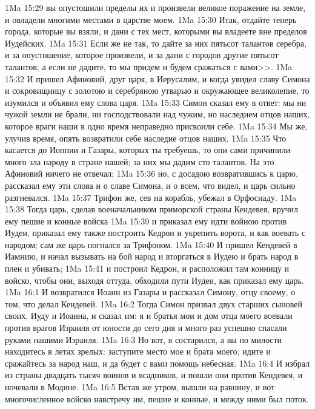 \vs 1Ma 15:29 вы опустошили пределы их и произвели великое поражение на земле, и овладели многими местами в царстве моем.
\vs 1Ma 15:30 Итак, отдайте теперь города, которые вы взяли, и дани с тех мест, которыми вы владеете вне пределов Иудейских.
\vs 1Ma 15:31 Если же не так, то дайте за них пятьсот талантов серебра, и за опустошение, которое произвели, и за дани с городов другие пятьсот талантов; а если не дадите, то мы придем и будем сражаться с вами>>.
\vs 1Ma 15:32 И пришел Афиновий, друг царя, в Иерусалим, и когда увидел славу Симона и сокровищницу с золотою и серебряною утварью и окружающее великолепие, то изумился и объявил ему слова царя.
\vs 1Ma 15:33 Симон сказал ему в ответ: мы ни чужой земли не брали, ни господствовали над чужим, но  наследием отцов наших, которое враги наши в одно время неправедно присвоили себе.
\vs 1Ma 15:34 Мы же, улучив время, опять возвратили себе наследие отцов наших.
\vs 1Ma 15:35 Что касается до Иоппии и Газары, которых ты требуешь, то они сами причинили много зла народу в стране нашей; за них мы дадим сто талантов. На это Афиновий ничего не отвечал;
\vs 1Ma 15:36 но, с досадою возвратившись к царю, рассказал ему эти слова и о славе Симона, и о всем, что видел, и царь сильно разгневался.
\vs 1Ma 15:37 Трифон же, сев на корабль, убежал в Орфосиаду.
\vs 1Ma 15:38 Тогда царь, сделав военачальником приморской страны Кендевея, вручил ему пешие и конные войска
\vs 1Ma 15:39 и приказал ему идти войною против Иудеи, приказал ему также построить Кедрон и укрепить ворота, и как воевать с народом; сам же царь погнался за Трифоном.
\vs 1Ma 15:40 И пришел Кендевей в Иамнию, и начал вызывать на бой народ и вторгаться в Иудею и брать народ в плен и убивать;
\vs 1Ma 15:41 и построил Кедрон, и расположил там конницу и войско, чтобы они, выходя оттуда, обходили пути Иудеи, как приказал ему царь.
\vs 1Ma 16:1 И возвратился Иоанн из Газары и рассказал Симону, отцу своему, о том, что делал Кендевей.
\vs 1Ma 16:2 Тогда Симон призвал двух старших сыновей своих, Иуду и Иоанна, и сказал им: я и братья мои и дом отца моего воевали против врагов Израиля от юности до сего дня и много раз успешно спасали руками нашими Израиля.
\vs 1Ma 16:3 Но вот, я состарился, а вы по милости  находитесь в летах зрелых: заступите место мое и брата моего, идите и сражайтесь за народ наш, и да будет с вами помощь небесная.
\vs 1Ma 16:4 И избрал из страны двадцать тысяч воинов и всадников, и пошли они против Кендевея, и ночевали в Модине.
\vs 1Ma 16:5 Встав же утром, вышли на равнину, и вот многочисленное войско навстречу им, пешие и конные, и между ними был поток.
